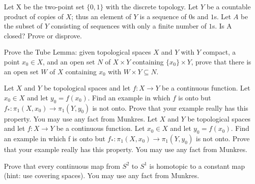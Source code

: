 \begin{problem}
  Let X be the two-point set \(\{0,1\}\) with the discrete topology. Let
  \(Y\) be a countable product of copies of \(X\); thus an element of \(Y\)
  is a sequence of \(0\)s and \(1\)s.  Let \(A\) be the subset of \(Y\)
  consisting of sequences with only a finite number of \(1\)s. Is A closed?
  Prove or disprove.
\end{problem}
\begin{solution}
\end{solution}

\begin{problem}
  Prove the Tube Lemma: given topological spaces \(X\) and \(Y\) with \(Y\)
  compact, a point \(x_0\in X\), and an open set \(N\) of \(X\times Y\)
  containing \(\{x_0\}\times Y\), prove that there is an open set \(W\) of
  \(X\) containing \(x_0\) with \(W\times Y\subseteq N\).
\end{problem}
\begin{solution}
\end{solution}

\begin{problem}
  Let \(X\) and \(Y\) be topological spaces and let \(f\colon X\to Y\) be a
  continuous function. Let \(x_0\in X\) and let \(y_0=f(x_0)\). Find an
  example in which \(f\) is onto but
  \(f_*\colon\pi_1(X,x_0)\to\pi_1(Y,y_0)\) is not onto. Prove that your
  example really has this property. You may use any fact from Munkres. Let
  \(X\) and \(Y\) be topological spaces and let \(f\colon X\to Y\) be a
  continuous function. Let \(x_0\in X\) and let \(y_0=f(x_0)\). Find an
  example in which f is onto but \(f_*\colon\pi_1(X,x_0)\to\pi_1(Y,y_0)\)
  is not onto. Prove that your example really has this property. You may
  use any fact from Munkres.
\end{problem}
\begin{solution}
\end{solution}

\begin{problem}
  Prove that every continuous map from \(S^2\) to \(S^1\) is homotopic to a
  constant map (hint: use covering spaces). You may use any fact from
  Munkres.
\end{problem}
\begin{solution}
\end{solution}

